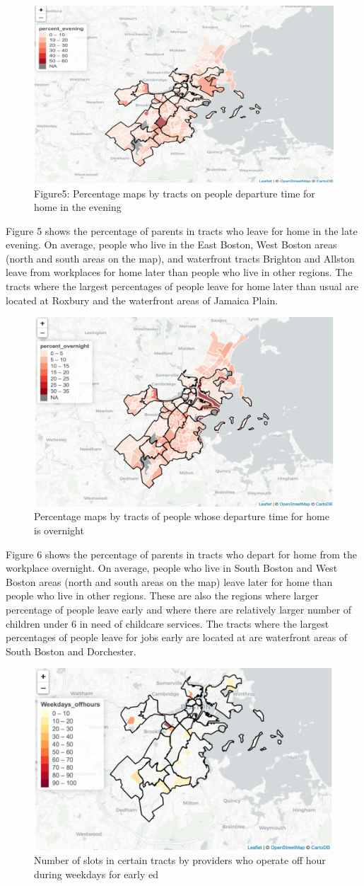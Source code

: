 \documentclass[10pt,letterpaper]{article}
\begin{document}
\begin{figure}

{\centering \includegraphics[width=0.25\linewidth]{fig5} 

}

\caption{Figure5: Percentage maps by tracts on people departure time for home in the evening}\label{fig:unnamed-chunk-7}
\end{figure}

Figure 5 shows the percentage of parents in tracts who leave for home in
the late evening. On average, people who live in the East Boston, West
Boston areas (north and south areas on the map), and waterfront tracts
Brighton and Allston leave from workplaces for home later than people
who live in other regions. The tracts where the largest percentages of
people leave for home later than usual are located at Roxbury and the
waterfront areas of Jamaica Plain.

\begin{figure}

{\centering \includegraphics[width=0.25\linewidth]{fig6} 

}

\caption{Percentage maps by tracts of people whose departure time for home is overnight}\label{fig:unnamed-chunk-8}
\end{figure}

Figure 6 shows the percentage of parents in tracts who depart for home
from the workplace overnight. On average, people who live in South
Boston and West Boston areas (north and south areas on the map) leave
later for home than people who live in other regions. These are also the
regions where larger percentage of people leave early and where there
are relatively larger number of children under 6 in need of childcare
services. The tracts where the largest percentages of people leave for
jobs early are located at are waterfront areas of South Boston and
Dorchester.

\begin{figure}

{\centering \includegraphics[width=0.25\linewidth]{fig7} 

}

\caption{Number of slots in certain tracts by providers who operate off hour during weekdays for early ed}\label{fig:unnamed-chunk-9}
\end{figure}
\end{document}
